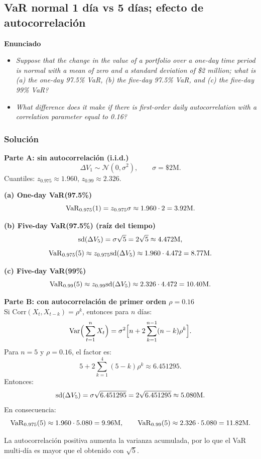 ﻿\subsection{VaR normal 1 día vs 5 días; efecto de autocorrelación}

\textbf{Enunciado}
\begin{itemize}
\item \emph{Suppose that the change in the value of a portfolio over a one-day time period is normal with a mean of zero and a standard deviation of \$2 million; what is 
(a) the one-day 97.5\% VaR, (b) the five-day 97.5\% VaR, and (c) the five-day 99\% VaR?}
\item \emph{What difference does it make if there is first-order daily autocorrelation with a correlation parameter equal to 0.16?}
\end{itemize}


\subsubsection*{Solución}

\textbf{Parte A: sin autocorrelación (i.i.d.)}\\
\[
\Delta V_1\sim \mathcal N(0,\sigma^2),\qquad \sigma=\$2\text{M}.
\]
Cuantiles: \(z_{0.975}\approx 1.960\), \(z_{0.99}\approx 2.326\).

\textbf{(a) One-day VaR(97.5\%)}\\
\[
\mathrm{VaR}_{0.975}(1)=z_{0.975}\sigma\approx 1.960\cdot 2 = 3.92\text{M}.
\]

\textbf{(b) Five-day VaR(97.5\%) (raíz del tiempo)}\\
\[
\mathrm{sd}(\Delta V_5)=\sigma\sqrt{5}=2\sqrt{5}\approx 4.472\text{M},
\]
\[
\mathrm{VaR}_{0.975}(5)\approx z_{0.975}\mathrm{sd}(\Delta V_5)\approx 1.960\cdot 4.472 = 8.77\text{M}.
\]

\textbf{(c) Five-day VaR(99\%)}\\
\[
\mathrm{VaR}_{0.99}(5)\approx z_{0.99}\mathrm{sd}(\Delta V_5)\approx 2.326\cdot 4.472 = 10.40\text{M}.
\]

\textbf{Parte B: con autocorrelación de primer orden \(\rho=0.16\)}\\
Si \(\mathrm{Corr}(X_t,X_{t-k})=\rho^k\), entonces para \(n\) días:
\[
\mathrm{Var}\Big(\sum_{t=1}^n X_t\Big)=\sigma^2\Big[n+2\sum_{k=1}^{n-1}(n-k)\rho^k\Big].
\]
Para \(n=5\) y \(\rho=0.16\), el factor es:
\[
5+2\sum_{k=1}^4 (5-k)\rho^k \approx 6.451295.
\]
Entonces:
\[
\mathrm{sd}(\Delta V_5)=\sigma\sqrt{6.451295}=2\sqrt{6.451295}\approx 5.080\text{M}.
\]
En consecuencia:
\[
\mathrm{VaR}_{0.975}(5)\approx 1.960\cdot 5.080 = 9.96\text{M},
\qquad
\mathrm{VaR}_{0.99}(5)\approx 2.326\cdot 5.080 = 11.82\text{M}.
\]


La autocorrelación positiva aumenta la varianza acumulada, por lo que el VaR multi-día es mayor que el obtenido con \(\sqrt{5}\).









